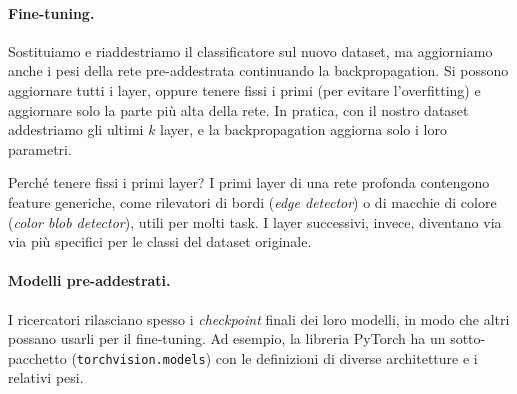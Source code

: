 \paragraph{Fine-tuning.}
Sostituiamo e riaddestriamo il classificatore sul nuovo dataset, ma aggiorniamo anche i pesi della rete pre-addestrata continuando la backpropagation. Si possono aggiornare tutti i layer, oppure tenere fissi i primi (per evitare l'overfitting) e aggiornare solo la parte più alta della rete. In pratica, con il nostro dataset addestriamo gli ultimi $k$ layer, e la backpropagation aggiorna solo i loro parametri.

Perché tenere fissi i primi layer? I primi layer di una rete profonda contengono feature generiche, come rilevatori di bordi (\emph{edge detector}) o di macchie di colore (\emph{color blob detector}), utili per molti task. I layer successivi, invece, diventano via via più specifici per le classi del dataset originale.

\paragraph{Modelli pre-addestrati.}
I ricercatori rilasciano spesso i \emph{checkpoint} finali dei loro modelli, in modo che altri possano usarli per il fine-tuning. Ad esempio, la libreria PyTorch ha un sotto-pacchetto (\texttt{torchvision.models}) con le definizioni di diverse architetture e i relativi pesi.

